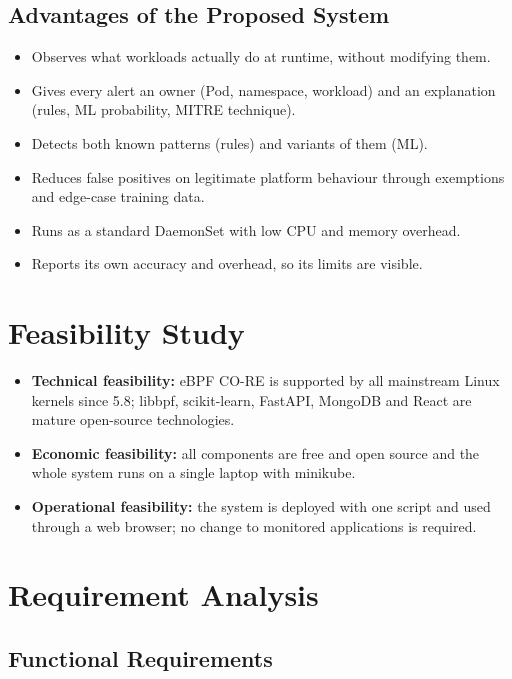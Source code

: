 \subsection{Advantages of the Proposed System}
\begin{itemize}
    \item Observes what workloads actually do at runtime, without modifying them.
    \item Gives every alert an owner (Pod, namespace, workload) and an explanation (rules,
          ML probability, MITRE technique).
    \item Detects both known patterns (rules) and variants of them (ML).
    \item Reduces false positives on legitimate platform behaviour through exemptions and
          edge-case training data.
    \item Runs as a standard DaemonSet with low CPU and memory overhead.
    \item Reports its own accuracy and overhead, so its limits are visible.
\end{itemize}

\section{Feasibility Study}

\begin{itemize}
    \item \textbf{Technical feasibility:} eBPF CO-RE is supported by all mainstream Linux
          kernels since 5.8; libbpf, scikit-learn, FastAPI, MongoDB and React are mature
          open-source technologies.
    \item \textbf{Economic feasibility:} all components are free and open source and the
          whole system runs on a single laptop with minikube.
    \item \textbf{Operational feasibility:} the system is deployed with one script and used
          through a web browser; no change to monitored applications is required.
\end{itemize}

\section{Requirement Analysis}

\subsection{Functional Requirements}

